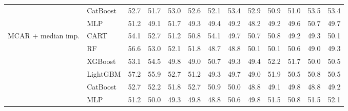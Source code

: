 \begin{table}[p]
\begin{tabular}{@{}llrrrrrrrrrrr@{}}
 & CatBoost & 52.7 & 51.7 & 53.0 & 52.6 & 52.1 & 53.4 & 52.9 & 50.9 & 51.0 & 53.5 & 53.4 \\
 & MLP & 51.2 & 49.1 & 51.7 & 49.3 & 49.4 & 49.2 & 48.2 & 49.2 & 49.6 & 50.7 & 49.7 \\
\midrule
MCAR + median imp. & CART & 54.1 & 52.7 & 51.2 & 50.8 & 54.1 & 49.7 & 50.7 & 50.8 & 49.2 & 49.3 & 50.1 \\
 & RF & 56.6 & 53.0 & 52.1 & 51.8 & 48.7 & 48.8 & 50.1 & 50.1 & 50.6 & 49.0 & 49.3 \\
 & XGBoost & 53.1 & 54.5 & 49.8 & 49.0 & 50.7 & 49.3 & 49.4 & 52.2 & 51.7 & 50.0 & 50.5 \\
 & LightGBM & 57.2 & 55.9 & 52.7 & 51.2 & 49.3 & 49.7 & 49.0 & 51.9 & 50.5 & 50.8 & 50.5 \\
 & CatBoost & 52.7 & 52.2 & 51.8 & 52.7 & 50.9 & 50.0 & 48.8 & 49.1 & 49.8 & 48.8 & 49.2 \\
 & MLP & 51.2 & 50.0 & 49.3 & 49.8 & 48.8 & 50.6 & 49.8 & 51.5 & 50.8 & 51.5 & 52.1 \\
\bottomrule
\end{tabular}
\end{table}

